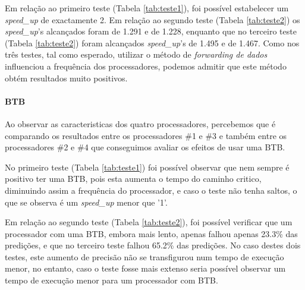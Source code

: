 Em relação ao primeiro teste (Tabela \ref{tab:teste1}), foi possível estabelecer um \textit{speed\_up} de exactamente 2. Em relação ao segundo teste (Tabela \ref{tab:teste2}) os \textit{speed\_up}'s alcançados foram de 1.291 e de 1.228, enquanto que no terceiro teste (Tabela \ref{tab:teste2}) foram alcançados \textit{speed\_up}'s de 1.495 e de 1.467. Como nos três testes, tal como esperado, utilizar o método de \textit{forwarding de dados} influenciou a frequência dos processadores, podemos admitir que este método obtém resultados muito positivos.

\paragraph{BTB}
Ao observar as caracteristicas dos quatro processadores, percebemos que é comparando os resultados entre os processadores \#1 e \#3 e também entre os processadores \#2 e \#4 que conseguimos avaliar os efeitos de usar uma BTB.

No primeiro teste (Tabela \ref{tab:teste1}) foi possível observar que nem sempre é positivo ter uma BTB, pois esta aumenta o tempo do caminho critico, diminuindo assim a frequência do processador, e caso o teste não tenha saltos, o que se observa é um \textit{speed\_up} menor que '1'.

Em relação ao segundo teste (Tabela \ref{tab:teste2}), foi possível verificar que um processador com uma BTB, embora mais lento, apenas falhou apenas 23.3\% das predições, e que no terceiro teste falhou 65.2\% das predições. No caso destes dois testes, este aumento de precisão não se transfigurou num tempo de execução menor, no entanto, caso o teste fosse mais extenso seria possível observar um tempo de execução menor para um processador com BTB.